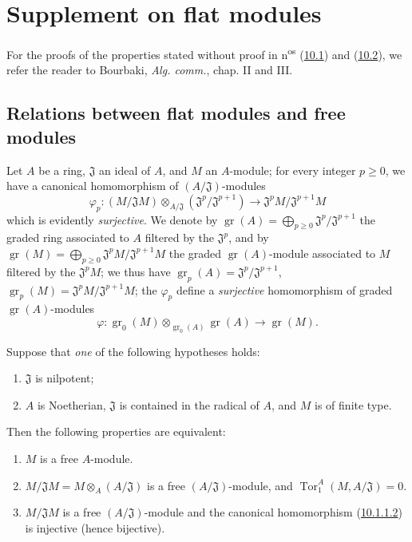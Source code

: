 \section{Supplement on flat modules}
\label{section:0.10}

For the proofs of the properties stated without proof in
n\textsuperscript{os} (\hyperref[subsection:0.10.1]{10.1}) and
(\hyperref[subsection:0.10.2]{10.2}), we refer the reader to Bourbaki,
\emph{Alg. comm.}, chap. II and III.

\subsection{Relations between flat modules and free modules}
\label{subsection:0.10.1}

\begin{env}[10.1.1]
\label{0.10.1.1}
Let $A$ be a ring, $\mathfrak{J}$ an ideal of $A$, and $M$ an $A$-module; for
every integer $p\geq0$, we have a canonical homomorphism of
$(A/\mathfrak{J})$-modules
\[
\label{0.10.1.1.1}
  \varphi_p:(M/\mathfrak{J}M)\otimes_{A/\mathfrak{J}}
  (\mathfrak{J}^p/\mathfrak{J}^{p+1})
  \longrightarrow \mathfrak{J}^pM/\mathfrak{J}^{p+1}M
  \tag{10.1.1.1}
\]
which is evidently \emph{surjective}. We denote by
$\operatorname{gr}(A)=\bigoplus_{p\geq0}\mathfrak{J}^p/\mathfrak{J}^{p+1}$ the graded ring
associated to $A$ filtered by the $\mathfrak{J}^p$, and by
$\operatorname{gr}(M)=\bigoplus_{p\geq0}\mathfrak{J}^pM/\mathfrak{J}^{p+1}M$ the graded
$\operatorname{gr}(A)$-module associated to $M$ filtered by the $\mathfrak{J}^pM$; we
thus have $\operatorname{gr}_p(A)=\mathfrak{J}^p/\mathfrak{J}^{p+1}$,
$\operatorname{gr}_p(M)=\mathfrak{J}^pM/\mathfrak{J}^{p+1}M$; the $\varphi_p$ define
a \emph{surjective} homomorphism of graded $\operatorname{gr}(A)$-modules
\[
\label{0.10.1.1.2}
  \varphi:\operatorname{gr}_0(M)\otimes_{\operatorname{gr}_0(A)}
  \operatorname{gr}(A)\longrightarrow\operatorname{gr}(M).
  \tag{10.1.1.2}
\]
\end{env}

\begin{env}[10.1.2]
\label{0.10.1.2}
Suppose that \emph{one} of the following hypotheses holds:
\begin{enumerate}
  \item[(i)] $\mathfrak{J}$ is nilpotent;
  \item[(ii)] $A$ is Noetherian, $\mathfrak{J}$ is contained in the radical of
    $A$, and $M$ is of finite type.
\end{enumerate}
Then the following properties are equivalent:
\begin{enumerate}
  \item[$a)$] $M$ is a free $A$-module.
  \item[$b)$] $M/\mathfrak{J}M=M\otimes_A(A/\mathfrak{J})$ is a free
    $(A/\mathfrak{J})$-module, and
    $\operatorname{Tor}_1^A(M,A/\mathfrak{J})=0$.
  \item[$c)$] $M/\mathfrak{J}M$ is a free $(A/\mathfrak{J})$-module and
    the canonical homomorphism (\hyperref[0.10.1.1.2]{10.1.1.2}) is
    injective (hence bijective).
\end{enumerate}
\end{env}

